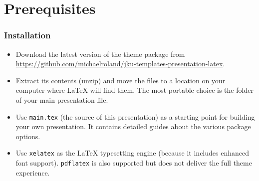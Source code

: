 \documentclass[utf8,aspectratio=169,ngerman,english]{beamer}
\begin{document}
\maketitle


\section{Prerequisites}

\begin{frame}
\frametitle{Installation}

\begin{itemize}
\item Download the latest version of the theme package from \url{https://github.com/michaelroland/jku-templates-presentation-latex}.
\item Extract its contents (unzip) and move the files to a location on your computer where {\LaTeX} will find them. The most portable choice is the folder of your main presentation file.
\item Use \texttt{main.tex} (the source of this presentation) as a starting point for building your own presentation. It contains detailed guides about the various package options.
\item Use \texttt{xelatex} as the {\LaTeX} typesetting engine (because it includes enhanced font support). \texttt{pdflatex} is also supported but does not deliver the full theme experience.
\end{itemize}
\end{frame}
\end{document}
